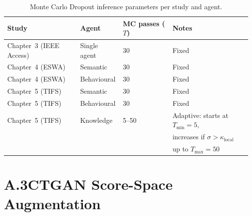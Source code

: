 \begin{table}[ht]
\centering
\caption{Monte Carlo Dropout inference parameters per study and agent.}
\label{tab:app_mcd}
\begin{tabular}{@{}llll@{}}
\toprule
\textbf{Study} & \textbf{Agent} & \textbf{MC passes ($T$)} & \textbf{Notes} \\
\midrule
Chapter~3 (IEEE Access) & Single agent     & 30  & Fixed \\
Chapter~4 (ESWA)        & Semantic         & 30  & Fixed \\
Chapter~4 (ESWA)        & Behavioural      & 30  & Fixed \\
Chapter~5 (TIFS)        & Semantic         & 30  & Fixed \\
Chapter~5 (TIFS)        & Behavioural      & 30  & Fixed \\
Chapter~5 (TIFS)        & Knowledge        & 5--50 & Adaptive: starts at $T_{\min}=5$, \\
                        &                  &       & increases if $\sigma > \kappa_{\mathrm{local}}$ \\
                        &                  &       & up to $T_{\max}=50$ \\
\bottomrule
\end{tabular}
\end{table}

\section*{A.3\quad CTGAN Score-Space Augmentation}

